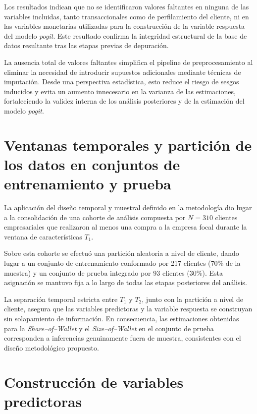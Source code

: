     Los resultados indican que no se identificaron valores faltantes en ninguna de las variables incluidas, tanto transaccionales como de perfilamiento del cliente, ni en las variables monetarias utilizadas para la construcción de la variable respuesta del modelo \emph{pogit}. Este resultado confirma la integridad estructural de la base de datos resultante tras las etapas previas de depuración.
    
    La ausencia total de valores faltantes simplifica el pipeline de preprocesamiento al eliminar la necesidad de introducir supuestos adicionales mediante técnicas de imputación. Desde una perspectiva estadística, esto reduce el riesgo de sesgos inducidos y evita un aumento innecesario en la varianza de las estimaciones, fortaleciendo la validez interna de los análisis posteriores y de la estimación del modelo \emph{pogit}.


\section{Ventanas temporales y partición de los datos en conjuntos de entrenamiento y prueba}

    La aplicación del diseño temporal y muestral definido en la metodología dio lugar a la consolidación de una cohorte de análisis compuesta por \(N = 310\) clientes empresariales que realizaron al menos una compra a la empresa focal durante la ventana de características \(T_{1}\).

    Sobre esta cohorte se efectuó una partición aleatoria a nivel de cliente, dando lugar a un conjunto de entrenamiento conformado por 217 clientes (70\% de la muestra) y un conjunto de prueba integrado por 93 clientes (30\%). Esta asignación se mantuvo fija a lo largo de todas las etapas posteriores del análisis.
    
    La separación temporal estricta entre \(T_{1}\) y \(T_{2}\), junto con la partición a nivel de cliente, asegura que las variables predictoras y la variable respuesta se construyan sin solapamiento de información. En consecuencia, las estimaciones obtenidas para la \emph{Share--of--Wallet} y el \emph{Size--of--Wallet} en el conjunto de prueba corresponden a inferencias genuinamente fuera de muestra, consistentes con el diseño metodológico propuesto.
        
\section{Construcción de variables predictoras}


